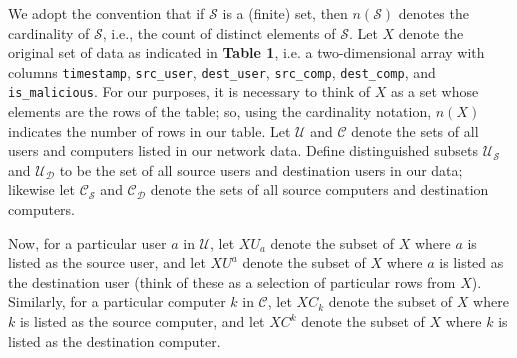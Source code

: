 \documentclass[sigconf]{acmart}
\begin{document}

We adopt the convention that if $\mathcal S$ is a (finite) set, then $n(\mathcal S)$ denotes the cardinality of $\mathcal S$, i.e., the count of distinct elements of $\mathcal S$.  Let $X$ denote the original set of data as indicated in \textbf{Table 1}, i.e. a two-dimensional array with columns \texttt{timestamp}, \texttt{src\_user}, \texttt{dest\_user}, \texttt{src\_comp}, \texttt{dest\_comp}, and \texttt{is\_malicious}.  For our purposes, it is necessary to think of $X$ as a set whose elements are the rows of the table;  so, using the cardinality notation, $n(X)$ indicates the number of rows in our table.  Let $\mathcal U$ and $\mathcal C$ denote the sets of all users and computers listed in our network data.  Define
distinguished subsets $\mathcal{U_S}$ and $\mathcal{U_D}$ to be the set of all source users and destination users in our data;  likewise let $\mathcal{C_S}$ and $\mathcal{C_D}$ denote the sets of all source computers and destination computers.

Now, for a particular user $a$ in $\mathcal{U}$, let $XU_a$ denote the subset of $X$ where $a$ is listed as the source user, and let $XU^a$ denote the subset of $X$ where $a$ is listed as the destination user (think of these as a
selection of particular rows from $X$).  Similarly, for a particular computer $k$ in $\mathcal C$, let $XC_k$ denote the subset of $X$ where $k$ is listed as the source computer, and let $XC^k$ denote the subset of $X$ where $k$ is listed as the
destination computer.
\end{document}
